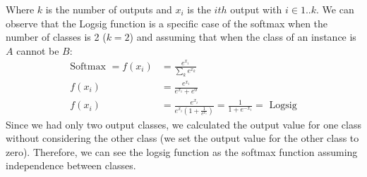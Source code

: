 \documentclass{article}[11pt]
\begin{document}
\begin{comment}
softmax & logsig & crossentropy & 50.000000 & 0.400000 & 0.200000 & 0.400000 & dividerand & traingdx & 1000.000000 & 6.000000 & 0.000010 & 0.900000 & 0.100000 & 0.494425 \\ 
softmax & logsig & crossentropy & 50.000000 & 0.100000 & 0.100000 & 0.800000 & dividerand & traingdx & 1000.000000 & 6.000000 & 0.000010 & 0.900000 & 0.100000 & 0.409543 \\ 
softmax & logsig & crossentropy & 200.000000 & 0.800000 & 0.100000 & 0.100000 & dividerand & traingdx & 1000.000000 & 6.000000 & 0.000010 & 0.900000 & 0.100000 & 0.545559 \\ 
softmax & logsig & crossentropy & 200.000000 & 0.400000 & 0.200000 & 0.400000 & dividerand & traingdx & 1000.000000 & 6.000000 & 0.000010 & 0.900000 & 0.100000 & 0.514129 \\ 
softmax & logsig & crossentropy & 200.000000 & 0.100000 & 0.100000 & 0.800000 & dividerand & traingdx & 1000.000000 & 6.000000 & 0.000010 & 0.900000 & 0.100000 & 0.423430 \\ 
softmax & logsig & crossentropy & 500.000000 & 0.800000 & 0.100000 & 0.100000 & dividerand & traingdx & 1000.000000 & 6.000000 & 0.000010 & 0.900000 & 0.100000 & 0.535948 \\ 
softmax & logsig & crossentropy & 500.000000 & 0.400000 & 0.200000 & 0.400000 & dividerand & traingdx & 1000.000000 & 6.000000 & 0.000010 & 0.900000 & 0.100000 & 0.491061 \\ 
softmax & logsig & crossentropy & 500.000000 & 0.100000 & 0.100000 & 0.800000 & dividerand & traingdx & 1000.000000 & 6.000000 & 0.000010 & 0.900000 & 0.100000 & 0.407092 \\ 
\hline 
\end{tabular}
\end{adjustbox}
\end{landscape}
\end{comment}


Where $k$ is the number of outputs and $x_i$ is the $ith$ output with $i \in 1..k$. We can observe that the Logsig function is a specific case of the softmax when the number of classes is 2 ($k = 2$) and assuming that when the class of an instance is $A$ cannot be $B$:
\begin{align*}
    \textrm{Softmax } = f(x_i) &= \frac{e^{x_i}}{\sum_k {e^{x_k}}} \\
                        f(x_i) &= \frac{e^{x_i}}{e^{x_i} + e^{0}} \\
                        f(x_i) &= \frac{e^{x_i}}{e^{x_i}(1+\frac{1}{e^{x_i}})} = \frac{1}{1+e^{-x_i}} = \textrm{ Logsig}
\end{align*}
Since we had only two output classes, we calculated the output value for one class without considering the other class (we set the output value for the other class to zero). Therefore, we can see the logsig function as the softmax function assuming independence between classes.
\end{document}
